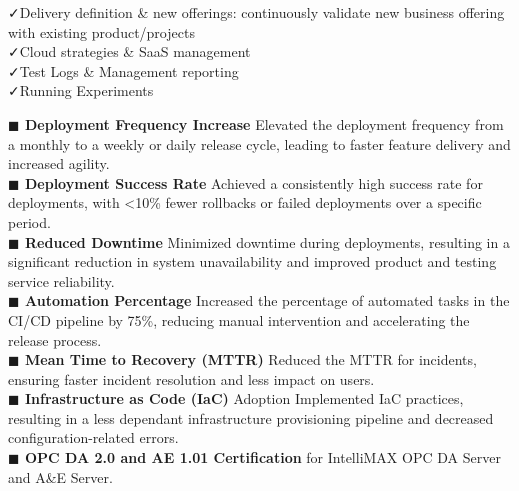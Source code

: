 \documentclass[]{cv-class}
\begin{document}
\begin{aside}
                 \vspace{2mm} \faCheck Delivery definition \& new offerings: continuously validate new business offering with existing product/projects \\
             \vspace{2mm} \faCheck Cloud strategies \&  SaaS  management \\
        \vspace{2mm} \faCheck Test Logs \& Management reporting \\
        \vspace{2mm} \faCheck Running Experiments \\

  

\end{aside}
        \textbf{$\blacksquare$ Deployment Frequency Increase} Elevated the deployment frequency from a monthly to a weekly or daily release cycle, leading to faster feature delivery and increased agility.\\
         \textbf{$\blacksquare$ Deployment Success Rate} Achieved a consistently high success rate for deployments, with <10\% fewer rollbacks or failed deployments over a specific period.\\
         \textbf{$\blacksquare$ Reduced Downtime} Minimized downtime during deployments, resulting in a significant reduction in system unavailability and improved product and testing service reliability.\\
        \textbf{$\blacksquare$ Automation Percentage} Increased the percentage of automated tasks in the CI/CD pipeline by 75\%, reducing manual intervention and accelerating the release process.\\
         \textbf{$\blacksquare$ Mean Time to Recovery (MTTR)} Reduced the MTTR for incidents, ensuring faster incident resolution and less impact on users.\\
        \textbf{$\blacksquare$ Infrastructure as Code (IaC)} Adoption Implemented IaC practices, resulting in a less dependant infrastructure provisioning pipeline and decreased configuration-related errors.\\
        \textbf{$\blacksquare$ OPC DA 2.0 and AE 1.01 Certification} for IntelliMAX OPC DA Server and A\&E Server.
\end{document}
